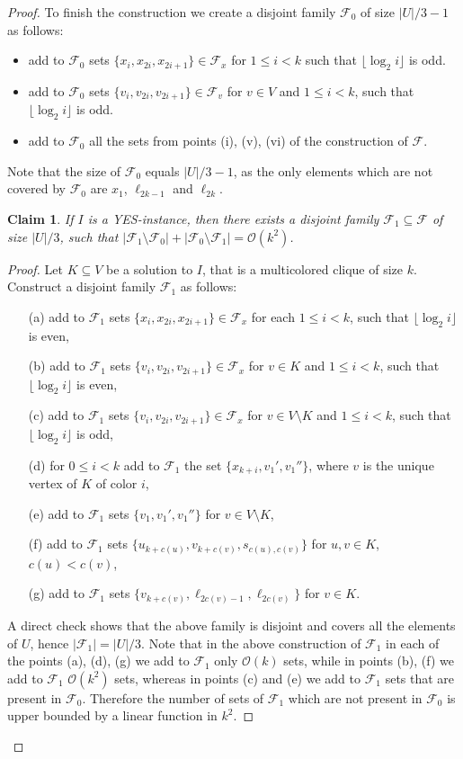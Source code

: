 \documentclass[11pt]{article}
\newtheorem{claim}[theorem]{Claim}
\theoremstyle{definition}
\newcommand{\cF}{{\mathcal{F}}}
\newcommand{\Oh}{\ensuremath{\mathcal{O}}}
\begin{document}
\begin{proof}
To finish the construction we create a disjoint family $\cF_0$ of size $|U|/3-1$ as follows:
\begin{itemize}
  \item add to $\cF_0$ sets $\{x_i, x_{2i}, x_{2i+1}\} \in \cF_x$ for $1 \le i < k$ such that $\lfloor \log_2 i \rfloor$ is odd.
  \item add to $\cF_0$ sets $\{v_i, v_{2i}, v_{2i+1}\} \in \cF_v$ for $v \in V$ and $1 \le i < k$, such that $\lfloor \log_2 i \rfloor$ is odd.
  \item add to $\cF_0$ all the sets from points (i), (v), (vi) of the construction of $\cF$.
\end{itemize}

Note that the size of $\cF_0$ equals $|U|/3-1$, as the only elements which are not covered by $\cF_0$ are $x_1$, $\ell_{2k-1}$ and $\ell_{2k}$.

\begin{claim}
\label{claim:1}
If $I$ is a YES-instance, then there exists a disjoint family $\cF_1 \subseteq \cF$ of size $|U|/3$,
such that $|\cF_1 \setminus \cF_0| + |\cF_0 \setminus \cF_1|= \Oh(k^2)$.
\end{claim}

\begin{proof}
Let $K \subseteq V$ be a solution to $I$, that is a multicolored clique of size $k$.
Construct a disjoint family $\cF_1$ as follows:
\begin{itemize}
\item[(a)] add to $\cF_1$ sets $\{x_i, x_{2i}, x_{2i+1}\} \in \cF_x$ for each $1 \le i < k$, such that $\lfloor \log_2 i \rfloor$ is even,
\item[(b)] add to $\cF_1$ sets $\{v_i, v_{2i}, v_{2i+1}\} \in \cF_x$ for $v \in K$ and $1 \le i < k$, such that $\lfloor \log_2 i \rfloor$ is even,
\item[(c)] add to $\cF_1$ sets $\{v_i, v_{2i}, v_{2i+1}\} \in \cF_x$ for $v \in V \setminus K$ and $1 \le i < k$, such that $\lfloor \log_2 i \rfloor$ is odd,
\item[(d)] for $0 \le i < k$ add to $\cF_1$ the set $\{x_{k+i}, v_1', v_1''\}$, where $v$ is the unique vertex of $K$ of color $i$,
\item[(e)] add to $\cF_1$ sets $\{v_1, v_1', v_1''\}$ for $v \in V \setminus K$,
\item[(f)] add to $\cF_1$ sets $\{u_{k+c(u)}, v_{k+c(v)}, s_{c(u),c(v)}\}$ for $u,v \in K$, $c(u) < c(v)$,
\item[(g)] add to $\cF_1$ sets $\{v_{k+c(v)}, \ell_{2c(v)-1}, \ell_{2c(v)}\}$ for $v \in K$.
\end{itemize}
A direct check shows that the above family is disjoint and covers all the elements of $U$, hence $|\cF_1| = |U|/3$.
Note that in the above construction of $\cF_1$ in each of the points (a), (d), (g) we add to $\cF_1$ only $\Oh(k)$ sets,
while in points (b), (f) we add to $\cF_1$ $\Oh(k^2)$ sets, whereas
in points (c) and (e) we add to $\cF_1$ sets that are present in $\cF_0$. 
Therefore the number of sets of $\cF_1$ which are not present in $\cF_0$ is upper bounded by a linear function in $k^2$.
\end{proof}


\end{proof}
\end{document}
